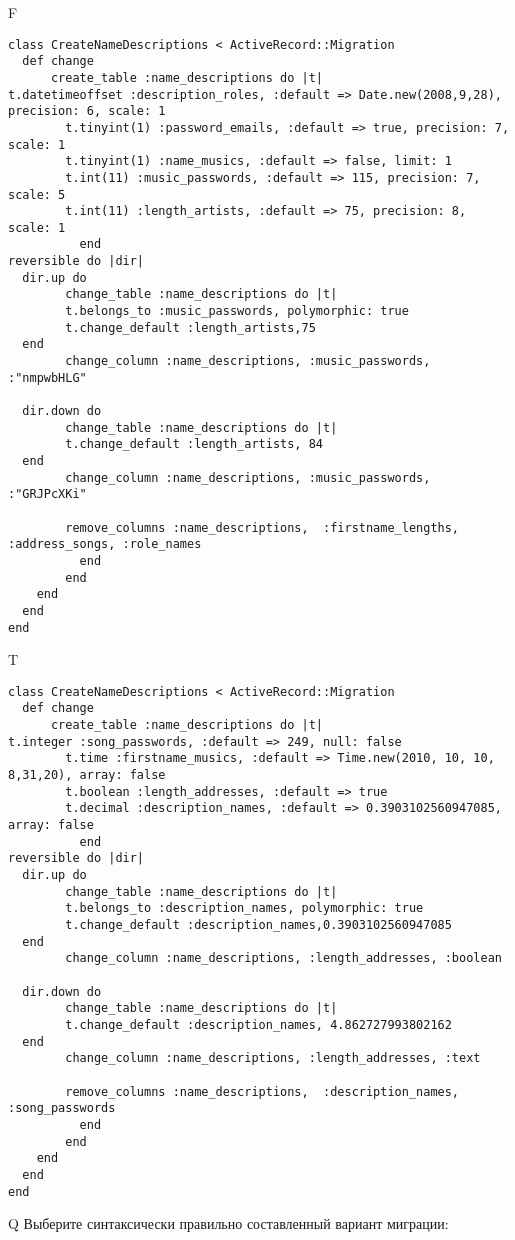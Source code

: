 F
\begin{verbatim}
class CreateNameDescriptions < ActiveRecord::Migration
  def change
	  create_table :name_descriptions do |t|
t.datetimeoffset :description_roles, :default => Date.new(2008,9,28), precision: 6, scale: 1
		t.tinyint(1) :password_emails, :default => true, precision: 7, scale: 1
		t.tinyint(1) :name_musics, :default => false, limit: 1
		t.int(11) :music_passwords, :default => 115, precision: 7, scale: 5
		t.int(11) :length_artists, :default => 75, precision: 8, scale: 1
		  end
reversible do |dir|
  dir.up do
		change_table :name_descriptions do |t|
		t.belongs_to :music_passwords, polymorphic: true
 		t.change_default :length_artists,75
  end
 		change_column :name_descriptions, :music_passwords, :"nmpwbHLG"
   
  dir.down do
		change_table :name_descriptions do |t|
		t.change_default :length_artists, 84
  end
 		change_column :name_descriptions, :music_passwords, :"GRJPcXKi"
   
		remove_columns :name_descriptions,  :firstname_lengths, :address_songs, :role_names 
	      end
	    end
    end 
  end
end

\end{verbatim}

T
\begin{verbatim}
class CreateNameDescriptions < ActiveRecord::Migration
  def change
	  create_table :name_descriptions do |t|
t.integer :song_passwords, :default => 249, null: false
		t.time :firstname_musics, :default => Time.new(2010, 10, 10, 8,31,20), array: false
		t.boolean :length_addresses, :default => true
		t.decimal :description_names, :default => 0.3903102560947085, array: false
		  end
reversible do |dir|
  dir.up do
		change_table :name_descriptions do |t|
		t.belongs_to :description_names, polymorphic: true
 		t.change_default :description_names,0.3903102560947085
  end
 		change_column :name_descriptions, :length_addresses, :boolean
   
  dir.down do
		change_table :name_descriptions do |t|
		t.change_default :description_names, 4.862727993802162
  end
 		change_column :name_descriptions, :length_addresses, :text
   
		remove_columns :name_descriptions,  :description_names, :song_passwords 
	      end
	    end
    end 
  end
end

\end{verbatim}

Q
Выберите синтаксически правильно составленный вариант миграции:

